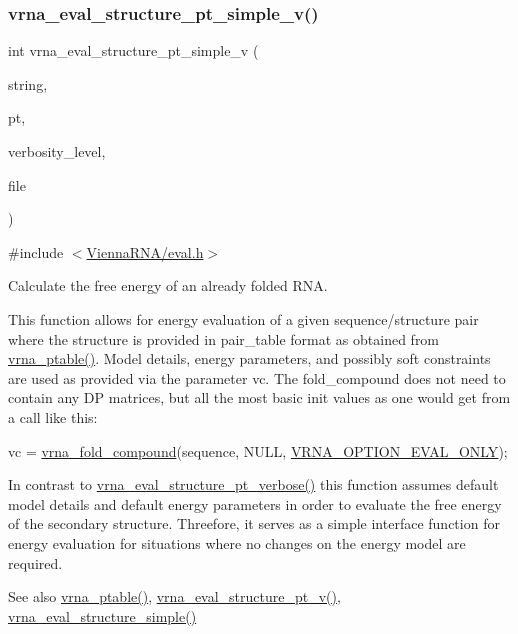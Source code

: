\subsubsection{\texorpdfstring{vrna\+\_\+eval\+\_\+structure\+\_\+pt\+\_\+simple\+\_\+v()}{vrna\_eval\_structure\_pt\_simple\_v()}}
{\footnotesize\ttfamily int vrna\+\_\+eval\+\_\+structure\+\_\+pt\+\_\+simple\+\_\+v (\begin{DoxyParamCaption}\item[{const char $\ast$}]{string,  }\item[{const short $\ast$}]{pt,  }\item[{int}]{verbosity\+\_\+level,  }\item[{F\+I\+LE $\ast$}]{file }\end{DoxyParamCaption})}



{\ttfamily \#include $<$\hyperlink{eval_8h}{Vienna\+R\+N\+A/eval.\+h}$>$}



Calculate the free energy of an already folded R\+NA. 

This function allows for energy evaluation of a given sequence/structure pair where the structure is provided in pair\+\_\+table format as obtained from \hyperlink{group__struct__utils_gae829fb8bb7f694c12a9c0bbc34c77c60}{vrna\+\_\+ptable()}. Model details, energy parameters, and possibly soft constraints are used as provided via the parameter \textquotesingle{}vc\textquotesingle{}. The fold\+\_\+compound does not need to contain any DP matrices, but all the most basic init values as one would get from a call like this\+: 
\begin{DoxyCode}
vc = \hyperlink{group__fold__compound_ga6601d994ba32b11511b36f68b08403be}{vrna\_fold\_compound}(sequence, NULL, \hyperlink{group__fold__compound_ga61469c423131552c8483229f8b6c7e0e}{VRNA\_OPTION\_EVAL\_ONLY});
\end{DoxyCode}
 In contrast to \hyperlink{group__eval_ga8a517cfeeae8c376ae7b1e0c401d38b4}{vrna\+\_\+eval\+\_\+structure\+\_\+pt\+\_\+verbose()} this function assumes default model details and default energy parameters in order to evaluate the free energy of the secondary structure. Threefore, it serves as a simple interface function for energy evaluation for situations where no changes on the energy model are required.

\begin{DoxySeeAlso}{See also}
\hyperlink{group__struct__utils_gae829fb8bb7f694c12a9c0bbc34c77c60}{vrna\+\_\+ptable()}, \hyperlink{group__eval_ga2c6533ba0afe4c88d335d8f1e0e2a48e}{vrna\+\_\+eval\+\_\+structure\+\_\+pt\+\_\+v()}, \hyperlink{group__eval_ga7e5273464b775d4130245681312c1369}{vrna\+\_\+eval\+\_\+structure\+\_\+simple()}
\end{DoxySeeAlso}

